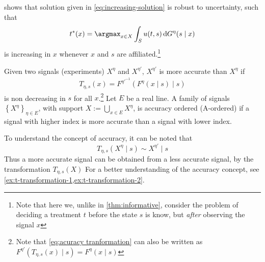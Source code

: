 \documentclass[10pt,a4paper]{article}
\begin{document}
\textcite{Athey2002}  shows that solution given in \cref{eq:increasing-solution} is robust to uncertainty, such that
\[
	t^*(x)=\argmax_{x\in X}\int_Su(t,s)\dif G^\eta(s\mid x)
\]
is increasing in \(x\)  whenever \(x\) and \(s\) are affiliated.\footnote{Note that here we, unlike in \cref{thm:informative}, consider the problem of deciding a treatment \(t\) before the state \(s\) is know, but \emph{after} observing the signal \(x\) }

\begin{definition}\label{def:accuracy}
\parencite{Persico2000} Given two signals (experiments) \(X^{\eta}\) and \(X^{\eta'}\),  \(X^{\eta'}\) is more accurate than \(X^{\eta}\) if
\begin{align}
    	T_{\eta,s}(x)=F^{\eta'^{-1}}(F^{\eta}(x\mid s)\mid s)\label{eq:acuracy tranformation}
\end{align}
is non decreasing in \(s\) for all \(x\).\footnote{Note that \cref{eq:acuracy tranformation} can also be written as \(F^{\eta'}(T_{\eta,s}(x)\mid s)=F^{\eta}(x\mid s)\)} Let \(E\) be a real line. A family of signals \(\left \{ X^{\eta}\right \} _{\eta\in E}\), with support \(X:=\bigcup_{x\in E}X^\eta\), is accuracy ordered (A-ordered) if a signal with higher index is more accurate than a signal with lower index.
\end{definition}

To understand the concept of accuracy, it can be noted that
\[
	T_{\eta,s}(X^{\eta}\mid s)\sim X^{\eta'}\mid s
\]
Thus a more accurate signal can be obtained from a less accurate signal, by the transformation \(T_{\eta,s}(X)\)  For a better understanding of the accuracy concept, see \cref{ex:t-transformation-1,ex:t-transformation-2}.
\end{document}

